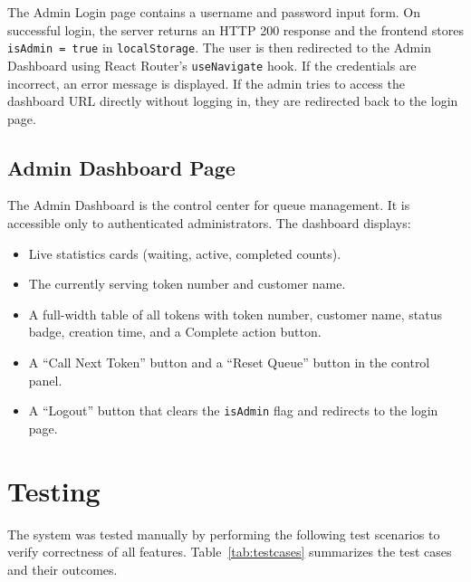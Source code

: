 The Admin Login page contains a username and password input form. On successful login, the server returns an HTTP 200 response and the frontend stores \texttt{isAdmin = true} in \texttt{localStorage}. The user is then redirected to the Admin Dashboard using React Router's \texttt{useNavigate} hook. If the credentials are incorrect, an error message is displayed. If the admin tries to access the dashboard URL directly without logging in, they are redirected back to the login page.

\subsection{Admin Dashboard Page}

The Admin Dashboard is the control center for queue management. It is accessible only to authenticated administrators. The dashboard displays:
\begin{itemize}
    \item Live statistics cards (waiting, active, completed counts).
    \item The currently serving token number and customer name.
    \item A full-width table of all tokens with token number, customer name, status badge, creation time, and a Complete action button.
    \item A ``Call Next Token'' button and a ``Reset Queue'' button in the control panel.
    \item A ``Logout'' button that clears the \texttt{isAdmin} flag and redirects to the login page.
\end{itemize}

\section{Testing}

The system was tested manually by performing the following test scenarios to verify correctness of all features. Table~\ref{tab:testcases} summarizes the test cases and their outcomes.

